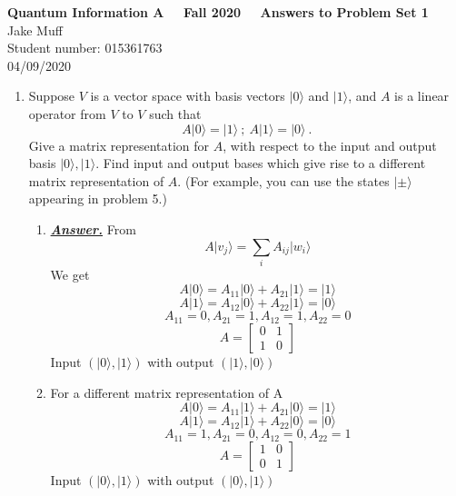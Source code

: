 \documentclass[12pt]{article}
\newcommand{\ket}[1]{\vert{#1}\rangle}
\begin{document}
\normalsize

\baselineskip 14pt

\begin{center}
{\Large {\bf Quantum Information A \ \ Fall 2020 \ \  Answers to Problem Set 1}}\\
{\large { Jake Muff}}\\
{Student number: 015361763}\\
{04/09/2020}
\end{center}



\begin{enumerate}

\item Suppose $V$ is a vector space with basis vectors $\ket{0}$ and $\ket{1}$, and $A$ is a linear operator from $V$ to $V$ such that 
$$
A\ket{0} = \ket{1} \ ; \ A\ket{1} = \ket{0} \ .
$$
Give a matrix representation for $A$, with respect to the input and output basis $\ket{0},\ket{1}$. Find input and output bases which give rise to a different 
matrix representation of $A$. (For example, you can use the states $\ket{\pm}$ appearing in problem 5.)

\begin{enumerate}
    \item \underline{\textbf{\emph{Answer.}}}
    From
    $$
    A\ket{v_j} = \sum_{i} A_{ij} \ket{w_i}
    $$
    We get
    $$
    A\ket{0} = A_{11}\ket{0}+A_{21}\ket{1} = \ket{1}
    $$
    $$
    A\ket{1} = A_{12}\ket{0}+A_{22}\ket{1} = \ket{0}
    $$
    $$ 
    A_{11} = 0, A_{21}=1,A_{12}=1,A_{22}=0
    $$
    $$ 
    A=
    \begin{bmatrix}
        0 & 1\\
        1 & 0
    \end{bmatrix}
    $$
    Input $ (\ket{0},\ket{1})$ with output $ (\ket{1},\ket{0})$
    \item For a different matrix representation of A
    $$
    A\ket{0} = A_{11}\ket{1}+A_{21}\ket{0} = \ket{1}
    $$
    $$
    A\ket{1} = A_{12}\ket{1}+A_{22}\ket{0} = \ket{0}
    $$
    $$ 
    A_{11} = 1, A_{21}=0,A_{12}=0,A_{22}=1
    $$
    $$ 
    A=
    \begin{bmatrix}
        1 & 0\\
        0 & 1
    \end{bmatrix}
    $$
    Input $ (\ket{0},\ket{1})$ with output $ (\ket{0},\ket{1})$
\end{enumerate}


\end{enumerate}
\end{document}
